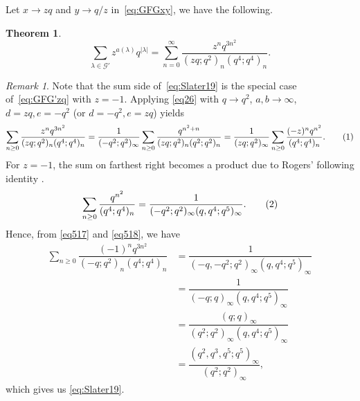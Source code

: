 \documentclass[12pt]{amsart}
\newtheorem{theorem}{Theorem}[section]
\theoremstyle{definition}
\theoremstyle{remark}
\newtheorem{remark}{Remark}
\numberwithin{equation}{section}
\newcommand\numberthis{\addtocounter{equation}{1}\tag{\theequation}}
\begin{document}
Let $x\to zq$ and $y\to q/z$ in~\eqref{eq:GFGxy}, we have the following.
\begin{theorem}
\begin{equation}\label{eq:GFG'zq}
\sum_{\lambda\in\mathcal{G'}}z^{a(\lambda)}q^{|\lambda|}=\sum_{n=0}^{\infty}\frac{z^{n}q^{3n^2}}{(zq;q^2)_n(q^4;q^4)_{n}}.
\end{equation}
\end{theorem}
\begin{remark}\label{rmk2}
Note that the sum side of~\eqref{eq:Slater19} is the special case of~\eqref{eq:GFG'zq} with $z = -1$. Applying \eqref{eq26} with $q\rightarrow q^2$, $a, b\rightarrow\infty$, $d=zq, e=-q^2$ (or $d=-q^2, e=zq$) yields
\begin{align*}
\sum_{n\ge 0}\dfrac{z^n q^{3n^2}}{(zq;q^2)_n(q^4;q^4)_n}=\dfrac{1}{(-q^2;q^2)_\infty}\sum_{n\ge 0}\dfrac{q^{n^2+n}}{(zq;q^2)_n(q^2;q^2)_n}=\dfrac{1}{(zq;q^2)_\infty}\sum_{n\ge 0}\dfrac{(-z)^n q^{n^2}}{(q^4;q^4)_n}.\numberthis\label{eq517}    
\end{align*}
For $z = -1$, the sum on farthest right becomes a product due to Rogers' following identity \cite{Rogers1894}.
\begin{align*}
\sum\limits_{n\ge 0}\dfrac{q^{n^2}}{(q^4;q^4)_n} = \dfrac{1}{(-q^2;q^2)_{\infty}(q,q^4;q^5)_{\infty}}.\numberthis\label{eq518}    
\end{align*}
Hence, from \eqref{eq517} and \eqref{eq518}, we have
\begin{align*}
\sum\limits_{n\ge 0}\dfrac{(-1)^nq^{3n^2}}{(-q;q^2)_n(q^4;q^4)_n} &= \dfrac{1}{(-q,-q^2;q^2)_{\infty}(q,q^4;q^5)_{\infty}}\\
&= \dfrac{1}{(-q;q)_{\infty}(q,q^4;q^5)_{\infty}}\\
&= \dfrac{(q;q)_{\infty}}{(q^2;q^2)_{\infty}(q,q^4;q^5)_{\infty}}\\
&= \dfrac{(q^2,q^3,q^5;q^5)_{\infty}}{(q^2;q^2)_{\infty}},
\end{align*}
which gives us \eqref{eq:Slater19}.\\
\end{remark}
\end{document}
